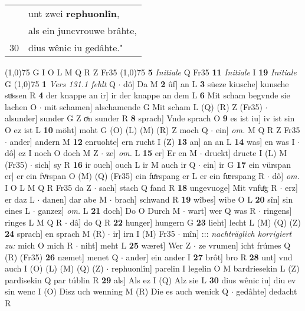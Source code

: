 \documentclass[8pt,a4paper,notitlepage]{article}
\begin{document}
\begin{table}[ht]
\begin{minipage}[t]{0.5\linewidth}
\begin{tabular}{rl}
 & unt zwei \textbf{rephuonlîn},\\ 
 & als ein juncvrouwe brâhte,\\ 
30 & dius wênic iu gedâhte."\\ 
\end{tabular}
\scriptsize
\line(1,0){75} \newline
G I O L M Q R Z Fr35 \newline
\line(1,0){75} \newline
\textbf{5} \textit{Initiale} Q Fr35  \textbf{11} \textit{Initiale} I  \textbf{19} \textit{Initiale} G  \newline
\line(1,0){75} \newline
\textbf{1} \textit{Vers 131.1 fehlt} Q   $\cdot$ dô] Da M \textbf{2} ûf] an L \textbf{3} süeze kiusche] kunsche suͯssen R \textbf{4} der knappe an ir] ir der knappe an dem L \textbf{6} Mit scham begvnde sie lachen O  $\cdot$ mit schamen] alschamende G Mit scham L (Q) (R) Z (Fr35)  $\cdot$ alsunder] sunder G Z oͯn sunder R \textbf{8} sprach] Vnde sprach O \textbf{9} es ist iu] iv ist sin O ez ist L \textbf{10} möht] moht G (O) (L) (M) (R) Z moch Q  $\cdot$ ein] \textit{om.} M Q R Z Fr35  $\cdot$ ander] andern M \textbf{12} enruohte] ern rucht I (Z) \textbf{13} an] an an L \textbf{14} was] en was I  $\cdot$ dô] ez I noch O doch M Z  $\cdot$ ze] \textit{om.} L \textbf{15} er] Er en M  $\cdot$ druckt] dructe I (L) M (Fr35)  $\cdot$ sich] sy R \textbf{16} ir ouch] ouch L ir M auch ir Q  $\cdot$ ein] ir G \textbf{17} ein vürspan er] er ein fvͦrspan O (M) (Q) (Fr35) ein fuͯrspang er L er ein fᵫrspang R  $\cdot$ dô] \textit{om.} I O L M Q R Fr35 da Z  $\cdot$ sach] stach Q fand R \textbf{18} ungevuoge] Mit vnfuͦg R  $\cdot$ erz] er daz L  $\cdot$ danen] dar abe M  $\cdot$ brach] schwand R \textbf{19} wîbes] wibe O L \textbf{20} sîn] sin eines L  $\cdot$ ganzez] \textit{om.} L \textbf{21} doch] Do O Durch M  $\cdot$ wart] wer Q was R  $\cdot$ ringens] ringes L M Q R  $\cdot$ dâ] do Q R \textbf{22} hunger] hungern G \textbf{23} lieht] lecht L (M) (Q) (Z) \textbf{24} sprach] en sprach M (R)  $\cdot$ ir] irn I (M) Fr35  $\cdot$ mîn] ::: \textit{nachträglich korrigiert zu:} mich O mich R  $\cdot$ niht] meht L \textbf{25} wæret] Wer Z  $\cdot$ ze vrumen] icht frúmes Q (R) (Fr35) \textbf{26} næmet] menet Q  $\cdot$ ander] ein ander I \textbf{27} brôt] bro R \textbf{28} unt] vnd auch I (O) (L) (M) (Q) (Z)  $\cdot$ rephuonlîn] parelin I legelin O M bardriesekin L (Z) pardisekin Q par túblin R \textbf{29} als] Als ez I (Q) Alz sie L \textbf{30} dius wênic iu] diu ev sin wenc I (O) Disz uch wenning M (R) Die es auch wenick Q  $\cdot$ gedâhte] dedacht R \newline

\end{minipage}
\end{table}
\end{document}
